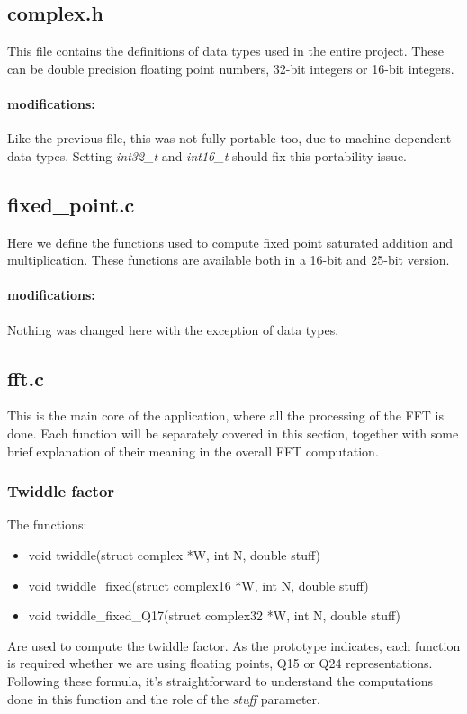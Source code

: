 \documentclass[a4paper]{article}
\begin{document}
\subsection{complex.h}
This file contains the definitions of data types used in the entire project. These can be double precision floating point numbers, 32-bit integers or 16-bit integers.
\paragraph{modifications:}
Like the previous file, this was not fully portable too, due to machine-dependent data types. Setting \textit{int32\_t} and \textit{int16\_t} should fix this portability issue. 

\subsection{fixed\_point.c}
Here we define the functions used to compute fixed point saturated addition and multiplication. These functions are available both in a 16-bit and 25-bit version.
\paragraph{modifications:}
Nothing was changed here with the exception of data types.

\subsection{fft.c}
This is the main core of the application, where all the processing of the FFT is done. Each function will be separately covered in this section, together with some brief explanation of their meaning in the overall FFT computation. 


\subsubsection{Twiddle factor}
The functions:
\begin{itemize}
\item void twiddle(struct complex *W, int N, double stuff)
\item void twiddle\_fixed(struct complex16 *W, int N, double stuff)         
\item void twiddle\_fixed\_Q17(struct complex32 *W, int N, double stuff)
\end{itemize}
Are used to compute the twiddle factor. As the prototype indicates, each function is required whether we are using floating points, Q15 or Q24 representations.\\
Following these formula, it's straightforward to understand the computations done in this function and the role of the \textit{stuff} parameter.
\end{document}
